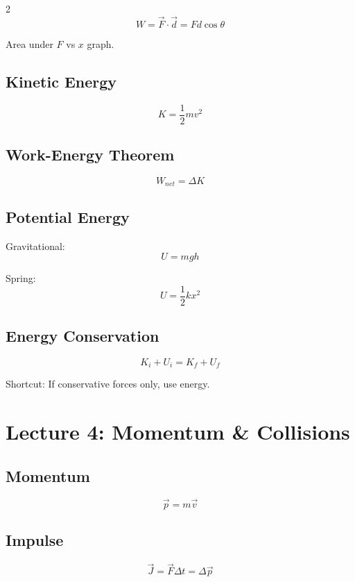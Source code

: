 \documentclass[10pt,landscape]{article}
\begin{document}
\begin{multicols}{2}
\[
W = \vec{F}\cdot\vec{d} = Fd\cos\theta
\]

Area under $F$ vs $x$ graph.

\subsection*{Kinetic Energy}

\[
K = \frac{1}{2}mv^2
\]

\subsection*{Work-Energy Theorem}

\[
W_{net} = \Delta K
\]

\subsection*{Potential Energy}

Gravitational:
\[
U = mgh
\]

Spring:
\[
U = \frac{1}{2}kx^2
\]

\subsection*{Energy Conservation}

\[
K_i + U_i = K_f + U_f
\]

Shortcut: If conservative forces only, use energy.


\section*{Lecture 4: Momentum \& Collisions}

\subsection*{Momentum}

\[
\vec{p} = m\vec{v}
\]

\subsection*{Impulse}

\[
\vec{J} = \vec{F}\Delta t = \Delta \vec{p}
\]


\end{multicols}
\end{document}
